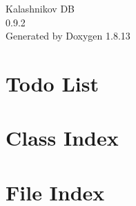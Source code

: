 \documentclass[twoside]{book}
\newcommand{\+}{\discretionary{\mbox{\scriptsize$\hookleftarrow$}}{}{}}
\newcommand{\clearemptydoublepage}{%
  \newpage{\pagestyle{empty}\cleardoublepage}%
}
\begin{document}
\hypersetup{pageanchor=false,
             bookmarksnumbered=true,
             pdfencoding=unicode
            }
\begin{titlepage}
\vspace*{7cm}
\begin{center}%
{\Large Kalashnikov DB \\[1ex]\large 0.\+9.\+2 }\\
\vspace*{1cm}
{\large Generated by Doxygen 1.8.13}\\
\end{center}
\end{titlepage}
\clearemptydoublepage
{}
\tableofcontents
\clearemptydoublepage
{}
\hypersetup{pageanchor=true}

\chapter{Todo List}
\label{todo}

\chapter{Class Index}

\chapter{File Index}

\end{document}
